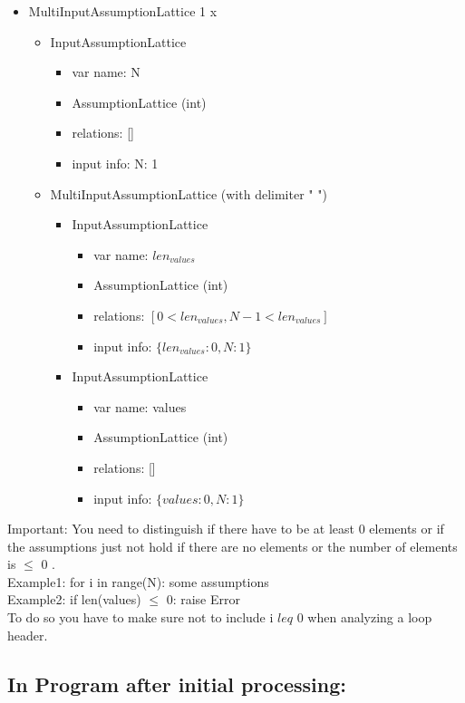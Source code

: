 \documentclass[11pt]{article}
\begin{document}
\begin{itemize}
  \item MultiInputAssumptionLattice 1 x
  \begin{itemize}
    \item InputAssumptionLattice 
    \begin{itemize}
      \item var name: N
      \item AssumptionLattice (int)
      \item relations: []
      \item input info: N: 1
    \end{itemize}
    \item MultiInputAssumptionLattice (with delimiter " ")
    \begin{itemize}
      \item InputAssumptionLattice 
      \begin{itemize}
	\item var name: $len_{values}$
	\item AssumptionLattice (int)
	\item relations: $[0 < len_{values}, N-1 < len_{values}]$
	\item input info: $\{len_{values}: 0, N: 1\}$
      \end{itemize}
      \item InputAssumptionLattice 
      \begin{itemize}
	\item var name: values
	\item AssumptionLattice (int)
	\item relations: []
	\item input info: $\{values: 0, N: 1\}$
      \end{itemize}
    \end{itemize}
  \end{itemize}
\end{itemize}

Important: You need to distinguish if there have to be at least 0 elements or if the assumptions just not hold if there are no elements or the number of elements is $\leq$ 0 .\\
Example1: for i in range(N): some assumptions\\
Example2: if len(values) $\leq$ 0: raise Error\\
To do so you have to make sure not to include i $leq$ 0 when analyzing a loop header.

\subsection{In Program after initial processing:}
\end{document}
